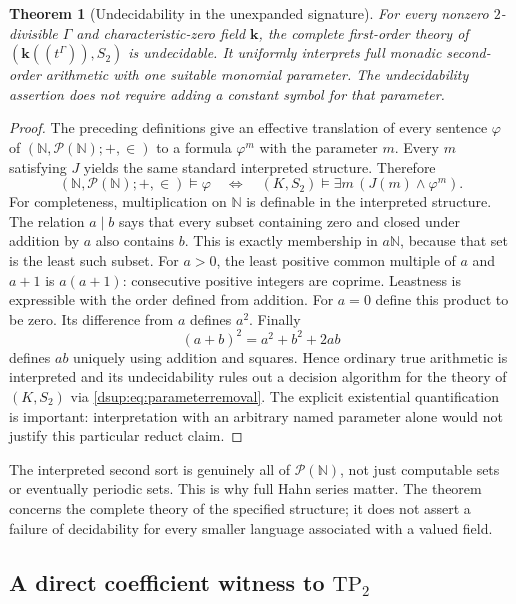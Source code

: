 \documentclass[11pt,oneside]{article}
\numberwithin{equation}{section}
\newtheorem{theorem}{Theorem}[section]
\theoremstyle{definition}
\theoremstyle{remark}
\newcommand{\N}{\mathbb N}
\newcommand{\kk}{\mathbf k}
\begin{document}
\begin{theorem}[Undecidability in the unexpanded signature]\label{dsup:thm:undecidable}
For every nonzero $2$-divisible $\Gamma$ and characteristic-zero field
$\kk$, the complete first-order theory of $(\kk((t^\Gamma)),S_2)$ is
undecidable. It uniformly interprets full monadic second-order arithmetic
with one suitable monomial parameter. The undecidability assertion does
not require adding a constant symbol for that parameter.
\end{theorem}
\begin{proof}
The preceding definitions give an effective translation of every
sentence $\varphi$ of $(\N,\mathcal P(\N);+,\in)$ to a formula
$\varphi^m$ with the parameter $m$. Every $m$ satisfying $J$ yields the
same standard interpreted structure. Therefore
\begin{equation}\label{dsup:eq:parameterremoval}
 (\N,\mathcal P(\N);+,\in)\models\varphi
 \quad\Longleftrightarrow\quad
 (K,S_2)\models\exists m\,(J(m)\land\varphi^m).
\end{equation}
For completeness, multiplication on $\N$ is definable in the interpreted
structure. The relation $a\mid b$ says that every subset containing zero
and closed under addition by $a$ also contains $b$. This is exactly
membership in $a\N$, because that set is the least such subset.
For $a>0$, the least positive common multiple of $a$ and $a+1$ is
$a(a+1)$: consecutive positive integers are coprime. Leastness is
expressible with the order defined from addition. For $a=0$ define this
product to be zero. Its difference from $a$ defines $a^2$. Finally
\[
 (a+b)^2=a^2+b^2+2ab
\]
defines $ab$ uniquely using addition and squares. Hence ordinary true
arithmetic is interpreted and its undecidability rules out a decision
algorithm for the theory of $(K,S_2)$ via
\eqref{dsup:eq:parameterremoval}. The explicit existential quantification is
important: interpretation with an arbitrary named parameter alone would
not justify this particular reduct claim.
\end{proof}

The interpreted second sort is genuinely all of $\mathcal P(\N)$, not
just computable sets or eventually periodic sets. This is why full Hahn
series matter. The theorem concerns the complete theory of the specified
structure; it does not assert a failure of decidability for every smaller
language associated with a valued field.

\subsection{A direct coefficient witness to \texorpdfstring{$\mathrm{TP}_2$}{TP2}}
\end{document}
